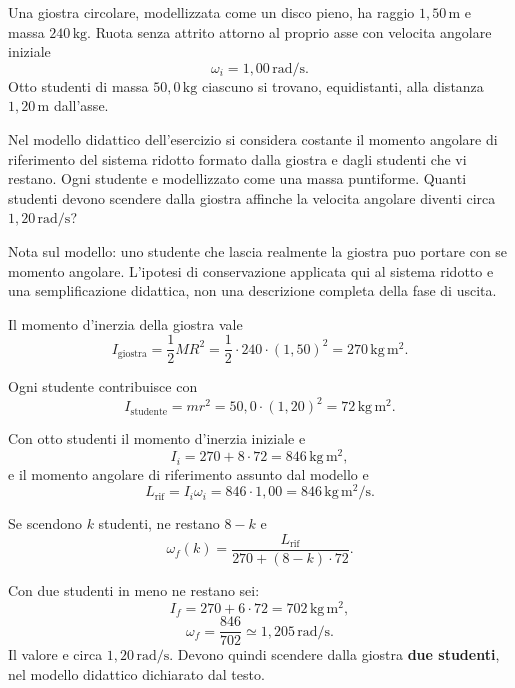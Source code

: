 
\begin{esercizio}
Una giostra circolare, modellizzata come un disco pieno, ha raggio
\(1{,}50\,\mathrm{m}\) e massa \(240\,\mathrm{kg}\). Ruota senza attrito
attorno al proprio asse con velocita angolare iniziale
\[
\omega_i=1{,}00\,\mathrm{rad/s}.
\]
Otto studenti di massa \(50{,}0\,\mathrm{kg}\) ciascuno si trovano,
equidistanti, alla distanza \(1{,}20\,\mathrm{m}\) dall'asse.

Nel modello didattico dell'esercizio si considera costante il momento angolare
di riferimento del sistema ridotto formato dalla giostra e dagli studenti che
vi restano. Ogni studente e modellizzato come una massa puntiforme. Quanti
studenti devono scendere dalla giostra affinche la velocita angolare diventi
circa \(1{,}20\,\mathrm{rad/s}\)?

Nota sul modello: uno studente che lascia realmente la giostra puo portare con
se momento angolare. L'ipotesi di conservazione applicata qui al sistema
ridotto e una semplificazione didattica, non una descrizione completa della
fase di uscita.
\end{esercizio}

\begin{soluzione}
Il momento d'inerzia della giostra vale
\[
I_\text{giostra}=\frac{1}{2}MR^2
=\frac{1}{2}\cdot240\cdot(1{,}50)^2
=270\,\mathrm{kg\,m^2}.
\]

Ogni studente contribuisce con
\[
I_\text{studente}=mr^2
=50{,}0\cdot(1{,}20)^2
=72\,\mathrm{kg\,m^2}.
\]

Con otto studenti il momento d'inerzia iniziale e
\[
I_i=270+8\cdot72
=846\,\mathrm{kg\,m^2},
\]
e il momento angolare di riferimento assunto dal modello e
\[
L_\text{rif}=I_i\omega_i
=846\cdot1{,}00
=846\,\mathrm{kg\,m^2/s}.
\]

Se scendono \(k\) studenti, ne restano \(8-k\) e
\[
\omega_f(k)=\frac{L_\text{rif}}
{270+(8-k)\cdot72}.
\]

Con due studenti in meno ne restano sei:
\[
I_f=270+6\cdot72
=702\,\mathrm{kg\,m^2},
\]
\[
\omega_f=\frac{846}{702}
\simeq1{,}205\,\mathrm{rad/s}.
\]
Il valore e circa \(1{,}20\,\mathrm{rad/s}\). Devono quindi scendere dalla
giostra \textbf{due studenti}, nel modello didattico dichiarato dal testo.
\end{soluzione}
